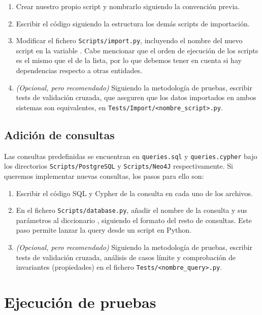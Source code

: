\begin{enumerate}
    \item Crear nuestro propio script y nombrarlo siguiendo la convención previa.
    \item Escribir el código siguiendo la estructura los demás scripts de importación.
    \item Modificar el fichero \verb|Scripts/import.py|, incluyendo el nombre del nuevo script en la variable . Cabe mencionar que el orden de ejecución de los scripts es el mismo que el de la lista, por lo que debemos tener en cuenta si hay dependencias respecto a otras entidades.
    \item \textit{(Opcional, pero recomendado)} Siguiendo la metodología de pruebas, escribir tests de validación cruzada, que aseguren que los datos importados en ambos sistemas son equivalentes,
    en \verb|Tests/Import/<nombre_script>.py|.
\end{enumerate}

\subsection{Adición de consultas}

Las consultas predefinidas se encuentran en \verb|queries.sql| y \verb|queries.cypher| bajo los directorios \verb|Scripts/PostgreSQL| y \verb|Scripts/Neo4J| respectivamente. Si queremos implementar nuevas consultas, los pasos para ello son:

\begin{enumerate}
    \item Escribir el código SQL y Cypher de la consulta en cada uno de los archivos.
    \item En el fichero \verb|Scripts/database.py|, añadir el nombre de la consulta y sus parámetros al diccionario , siguiendo el formato del resto de consultas. Este paso permite lanzar la query desde un script en Python.
    \item \textit{(Opcional, pero recomendado)} Siguiendo la metodología de pruebas, escribir tests de validación cruzada, análisis de casos límite y comprobación de invariantes (propiedades) en el fichero \verb|Tests/<nombre_query>.py|.
\end{enumerate}

\section{Ejecución de pruebas}

